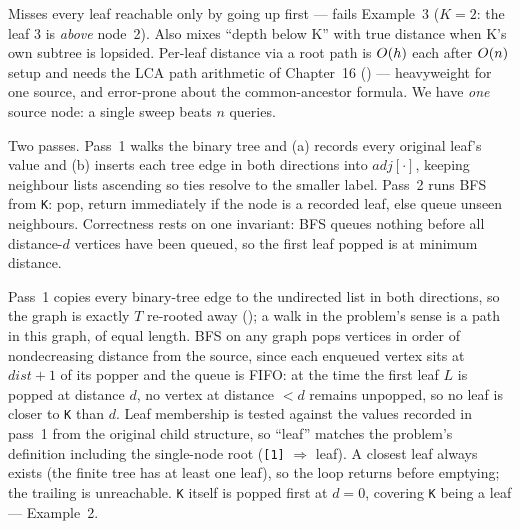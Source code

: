\begin{thinkbox}
{Misses every leaf reachable only by going up first --- fails Example~3 ($K=2$: the leaf
$3$ is \emph{above} node~2). Also mixes ``depth below K'' with true distance when K's own
subtree is lopsided.}
{Per-leaf distance via a root path is $O(h)$ each after $O(n)$ setup and needs
the LCA path arithmetic of Chapter~16 () --- heavyweight for one source, and
error-prone about the common-ancestor formula. We have \emph{one} source node: a single
sweep beats $n$ queries.}
\end{thinkbox}

Two passes. Pass~1 walks the binary tree and (a) records every original leaf's value and
(b) inserts each tree edge in both directions into $\mathit{adj}[\cdot]$, keeping
neighbour lists ascending so ties resolve to the smaller label. Pass~2 runs BFS from
\texttt{K}: pop, return immediately if the node is a recorded leaf, else queue unseen
neighbours. Correctness rests on one invariant: BFS queues nothing before all
distance-$d$ vertices have been queued, so the first leaf popped is at minimum distance.

\begin{proofbox}
Pass~1 copies every binary-tree edge to the undirected list in both directions, so the
graph is exactly $T$ re-rooted away (); a walk in the problem's
sense is a path in this graph, of equal length. BFS on any graph pops vertices in order
of nondecreasing distance from the source, since each enqueued vertex sits at
$\mathit{dist}+1$ of its popper and the queue is FIFO: at the time the first leaf $L$ is
popped at distance $d$, no vertex at distance $<d$ remains unpopped, so no leaf is
closer to \texttt{K} than $d$. Leaf membership is tested against the values recorded in
pass~1 from the original child structure, so ``leaf'' matches the problem's definition
including the single-node root (\texttt{[1]} $\Rightarrow$ leaf). A closest leaf always
exists (the finite tree has at least one leaf), so the loop returns before emptying; the
trailing  is unreachable. \texttt{K} itself is popped first at $d=0$,
covering \texttt{K} being a leaf --- Example~2.
\end{proofbox}

